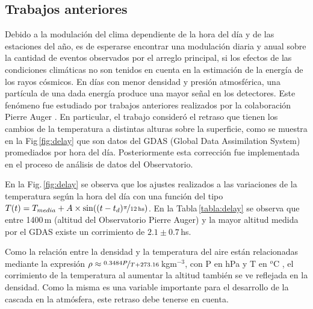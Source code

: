 \subsection{Trabajos anteriores}

Debido a la modulación del clima dependiente de la hora del día y de las estaciones del año, es de esperarse encontrar una modulación diaria y anual sobre la cantidad de eventos observados por el arreglo principal, si los efectos de las condiciones climáticas no son tenidos en cuenta en la estimación de la energía de los rayos cósmicos. En días con menor densidad y presión atmosférica, una partícula de una dada energía produce una mayor señal en los detectores. Este fenómeno fue estudiado por trabajos anteriores realizados por la colaboración Pierre Auger \cite{aab2017impact} \cite{collaboration2009atmospheric}. En particular, el trabajo \cite{aab2017impact} consideró el retraso que tienen los cambios de  la temperatura a distintas alturas sobre la superficie, como se muestra en la Fig\,\ref{fig:delay} que son datos del GDAS (Global Data Assimilation System) promediados por hora del día. Posteriormente esta corrección fue implementada en el proceso  de análisis de datos del Observatorio.


En la Fig.\,\ref{fig:delay} se observa que los ajustes realizados a las variaciones de la temperatura  según la hora del día con una función del tipo $T(t) = T_{media} + A\times \sin((t-t_d)\nicefrac{\pi}{12\,\text{hs}})$.  En la Tabla\,\ref{tabla:delay} se observa que entre 1400\,m (altitud del Observatorio Pierre Auger) y la mayor altitud medida por el GDAS existe un corrimiento de $2.1\pm0.7\,$hs.

Como la relación entre la densidad y la temperatura del aire están relacionadas mediante la expresión $\rho \approx \nicefrac{0.3484P}{T +273.16}\,$kgm$^{-3}$, con P en hPa y T en  $^o$C \cite{aab2017impact}, el corrimiento de la temperatura al aumentar la altitud también se ve reflejada en la densidad. Como la misma es una variable importante para el desarrollo de la cascada en la atmósfera, este retraso debe tenerse en cuenta.

